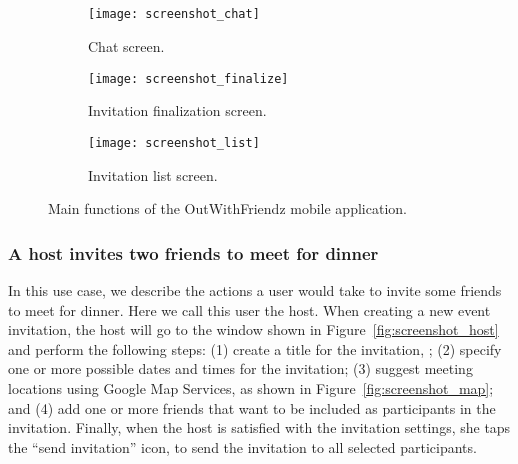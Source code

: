 \subsection{}
\label{sec:flow}

\begin{figure}
\centering
\begin{subfigure}{.33\textwidth}
  \centering
  \texttt{[image: screenshot\_chat]}
  \caption{Chat screen.}
  \label{fig:screenshot_chat}
\end{subfigure}%
\begin{subfigure}{.33\textwidth}
  \centering
  \texttt{[image: screenshot\_finalize]}
  \caption{Invitation finalization screen.}
  \label{fig:screenshot_finalize}
\end{subfigure}
\begin{subfigure}{.33\textwidth}
  \centering
  \texttt{[image: screenshot\_list]}
  \caption{Invitation list screen.}
  \label{fig:screenshot_list}
\end{subfigure}
\caption{Main functions of the OutWithFriendz mobile application.}
\end{figure}


\subsubsection{A host invites two friends to meet for dinner}
In this use case, we describe the actions a user would take to invite some friends to meet for 
dinner. Here we call this user the host. When creating 
a new event invitation, the host will go to the window shown in
Figure~\ref{fig:screenshot_host} and perform the following steps:
(1) create a title for the invitation, ; 
(2) specify one or more possible dates and times for the 
invitation; (3) suggest meeting locations using Google Map Services, as
shown in Figure~\ref{fig:screenshot_map}; and (4) add one or more friends that
want to be included as participants in the invitation. Finally, when the host is
satisfied with the invitation settings, she taps the ``send invitation'' icon, to send the invitation to all selected participants.

